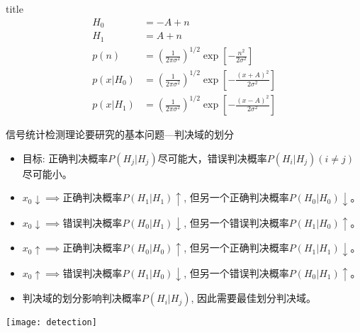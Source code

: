 \begin{frame}{title}
\begin{align*}
H_0&=-A+n\\
H_1&=A+n\\
p(n)&=\left(\frac{1}{2\pi\sigma^2}\right)^{1/2}\exp\left[-\frac{n^2}{2\sigma^2}\right]\\
p(x|H_0)&=\left(\frac{1}{2\pi\sigma^2}\right)^{1/2}\exp\left[-\frac{(x+A)^2}{2\sigma^2}\right]\\
p(x|H_1)&=\left(\frac{1}{2\pi\sigma^2}\right)^{1/2}\exp\left[-\frac{(x-A)^2}{2\sigma^2}\right]
\end{align*}
\end{frame}

\begin{frame}{信号统计检测理论要研究的基本问题---判决域的划分}
\begin{itemize}
	\item 目标: 正确判决概率$P(H_j|H_j)$尽可能大，错误判决概率$P(H_i|H_j)(i\ne j)$尽可能小。
	\item $x_0\downarrow\implies$正确判决概率$P(H_1|H_1)\uparrow$, 但另一个正确判决概率$P(H_0|H_0)\downarrow$。
	\item $x_0\downarrow\implies$错误判决概率$P(H_0|H_1)\downarrow$, 但另一个错误判决概率$P(H_1|H_0)\uparrow$。
	\item $x_0\uparrow\implies$正确判决概率$P(H_0|H_0)\uparrow$, 但另一个正确判决概率$P(H_1|H_1)\downarrow$。
	\item $x_0\uparrow\implies$错误判决概率$P(H_1|H_0)\downarrow$, 但另一个错误判决概率$P(H_0|H_1)\uparrow$。
	\item 判决域的划分影响判决概率$P(H_i|H_j)$, 因此需要最佳划分判决域。
\end{itemize}
\texttt{[image: detection]}
\end{frame}




